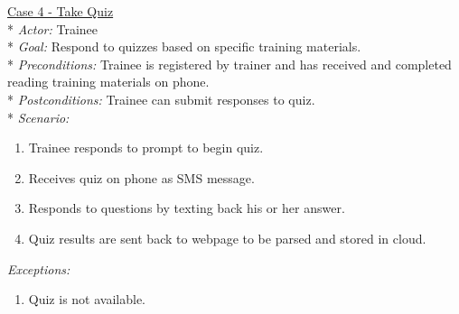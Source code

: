 \underline{Case 4 - Take Quiz}\\*
\textit{Actor:} Trainee\\*
\textit{Goal:} Respond to quizzes based on specific training materials.\\*
\textit{Preconditions:} Trainee is registered by trainer and has received and completed reading training materials on phone.\\*
\textit{Postconditions:} Trainee can submit responses to quiz.\\*
\textit{Scenario:}
\begin{enumerate}
	\item{Trainee responds to prompt to begin quiz.}
	\item{Receives quiz on phone as SMS message.}
	\item{Responds to questions by texting back his or her answer.}
	\item{Quiz results are sent back to webpage to be parsed and stored in cloud.}
\end{enumerate}
\textit{Exceptions:}
\begin{enumerate}
	\item{Quiz is not available.}
\end{enumerate}